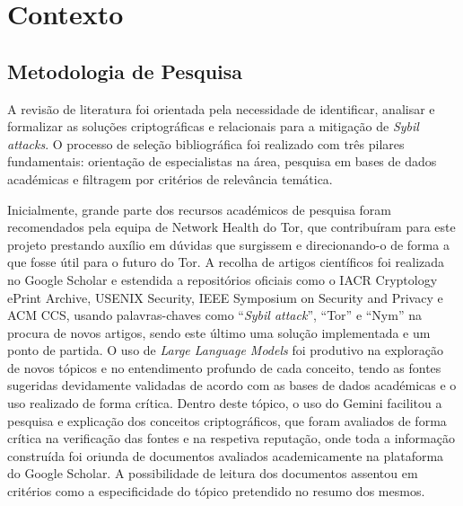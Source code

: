 
%

\chapter{Contexto}
\label{cha:contexto}

\glsresetall

\section{Metodologia de Pesquisa}
\label{sec:introducao}

A revisão de literatura foi orientada pela necessidade de identificar, analisar e formalizar as soluções criptográficas e relacionais para a mitigação de \textit{Sybil attacks}. O processo de seleção bibliográfica foi realizado com três pilares fundamentais: orientação de especialistas na área, pesquisa em bases de dados académicas e filtragem por critérios de relevância temática.

Inicialmente, grande parte dos recursos académicos de pesquisa foram recomendados pela equipa de Network Health do Tor, que contribuíram para este projeto prestando auxílio em dúvidas que surgissem e direcionando-o de forma a que fosse útil para o futuro do Tor. A recolha de artigos científicos foi realizada no Google Scholar e estendida a repositórios oficiais como o IACR Cryptology ePrint Archive, USENIX Security, IEEE Symposium on Security and Privacy e ACM CCS, usando palavras-chaves como “\textit{Sybil attack}”, “Tor” e “Nym” na procura de novos artigos, sendo este último uma solução implementada e um ponto de partida. O uso de \textit{Large Language Models} foi produtivo na exploração de novos tópicos e no entendimento profundo de cada conceito, tendo as fontes sugeridas devidamente validadas de acordo com as bases de dados académicas e o uso realizado de forma crítica. Dentro deste tópico, o uso do Gemini facilitou a pesquisa e explicação dos conceitos criptográficos, que foram avaliados de forma crítica na verificação das fontes e na respetiva reputação, onde toda a informação construída foi oriunda de documentos avaliados academicamente na plataforma do Google Scholar. A possibilidade de leitura dos documentos assentou em critérios como a especificidade do tópico pretendido no resumo dos mesmos.

